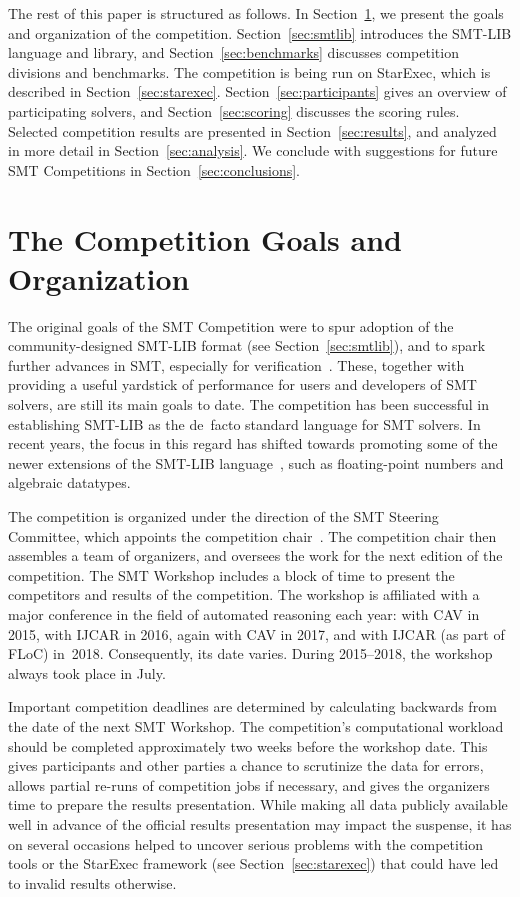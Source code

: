 \documentclass[dvipsnames,table,twoside,11pt]{article}
\begin{document}
The rest of this paper is structured as follows.  In
Section~\ref{sec:goals}, we present the goals and organization of the
competition.  Section~\ref{sec:smtlib} introduces the SMT-LIB language
and library, and Section~\ref{sec:benchmarks} discusses competition
divisions and benchmarks.  The competition is being run on StarExec,
which is described in Section~\ref{sec:starexec}.
Section~\ref{sec:participants} gives an overview of participating
solvers, and Section~\ref{sec:scoring} discusses the scoring rules.
Selected competition results are presented in
Section~\ref{sec:results}, and analyzed in more detail in
Section~\ref{sec:analysis}.  We conclude with suggestions for future
SMT Competitions in Section~\ref{sec:conclusions}.


\section{The Competition Goals and Organization}
\label{sec:goals}

The original goals of the SMT Competition were to spur adoption of the
community-designed SMT-LIB format (see Section~\ref{sec:smtlib}), and
to spark further advances in SMT, especially for
verification~\cite{BdMS05}.  These, together with providing a useful
yardstick of performance for users and developers of SMT solvers, are
still its main goals to date.  The competition has been successful in
establishing SMT-LIB as the de~facto standard language for SMT
solvers.  In recent years, the focus in this regard has shifted
towards promoting some of the newer extensions of the SMT-LIB
language~\cite{BarFT-RR-17}, such as floating-point numbers and
algebraic datatypes.

The competition is organized under the direction of the SMT Steering
Committee, which appoints the competition chair~\cite{smt-bylaws}.
The competition chair then assembles a team of organizers, and
oversees the work for the next edition of the competition.
%
The SMT Workshop includes a block of time to present the competitors
and results of the competition.  The workshop is affiliated with a
major conference in the field of automated reasoning each year: with
CAV in 2015, with IJCAR in 2016, again with CAV in 2017, and with
IJCAR (as part of FLoC) in~2018.  Consequently, its date varies.
During 2015--2018, the workshop always took place in July.

Important competition deadlines are determined by calculating
backwards from the date of the next SMT Workshop.  The competition's
computational workload should be completed approximately two weeks
before the workshop date.  This gives participants and other parties a
chance to scrutinize the data for errors, allows partial re-runs of
competition jobs if necessary, and gives the organizers time to
prepare the results presentation.  While making all data publicly
available well in advance of the official results presentation may
impact the suspense, it has on several occasions helped to uncover
serious problems with the competition tools or the StarExec framework
(see Section~\ref{sec:starexec}) that could have led to invalid
results otherwise.
\end{document}

